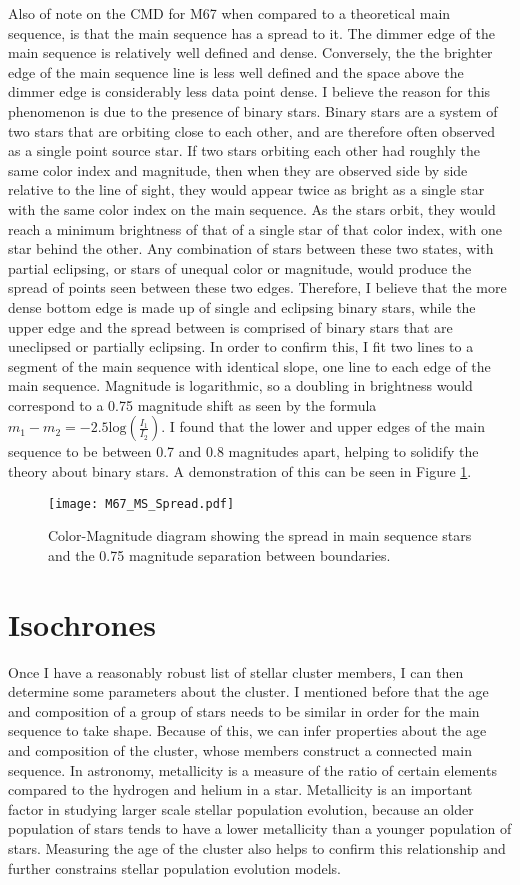 \documentclass[aps,prb,twocolumn,groupedaddress,nofootinbib,floatfix]{revtex4-1}
\begin{document}
Also of note on the CMD for M67 when compared to a theoretical main sequence, is that the main sequence has a spread to it. The dimmer edge of the main sequence is relatively well defined and dense. Conversely, the the brighter edge of the main sequence line is less well defined and the space above the dimmer edge is considerably less data point dense. I believe the reason for this phenomenon is due to the presence of binary stars. Binary stars are a system of two stars that are orbiting close to each other, and are therefore often observed as a single point source star. If two stars orbiting each other had roughly the same color index and magnitude, then when they are observed side by side relative to the line of sight, they would appear twice as bright as a single star with the same color index on the main sequence. As the stars orbit, they would reach a minimum brightness of that of a single star of that color index, with one star behind the other. Any combination of stars between these two states, with partial eclipsing, or stars of unequal color or magnitude, would produce the spread of points seen between these two edges. Therefore, I believe that the more dense bottom edge is made up of single and eclipsing binary stars, while the upper edge and the spread between is comprised of binary stars that are uneclipsed or partially eclipsing. In order to confirm this, I fit two lines to a segment of the main sequence with identical slope, one line to each edge of the main sequence. Magnitude is logarithmic, so a doubling in brightness would correspond to a 0.75 magnitude shift as seen by the formula $m_1-m_2 = -2.5\text{log}\left(\frac{I_1}{I_2}\right)$. I found that the lower and upper edges of the main sequence to be between 0.7 and 0.8 magnitudes apart, helping to solidify the theory about binary stars. A demonstration of this can be seen in Figure \ref{fig:MS_spread}.


\begin{figure}[!h]
	\centering
      \texttt{[image: M67\_MS\_Spread.pdf]}
	\caption{Color-Magnitude diagram showing the spread in main sequence stars and the 0.75 magnitude separation between boundaries.}
	\label{fig:MS_spread}
\end{figure}


\section*{Isochrones}
Once I have a reasonably robust list of stellar cluster members, I can then determine some parameters about the cluster. I mentioned before that the age and composition of a group of stars needs to be similar in order for the main sequence to take shape. Because of this, we can infer properties about the age and composition of the cluster, whose members construct a connected main sequence. In astronomy, metallicity is a measure of the ratio of certain elements compared to the hydrogen and helium in a star. Metallicity is an important factor in studying larger scale stellar population evolution, because an older population of stars tends to have a lower metallicity than a younger population of stars. Measuring the age of the cluster also helps to confirm this relationship and further constrains stellar population evolution models.
\end{document}
